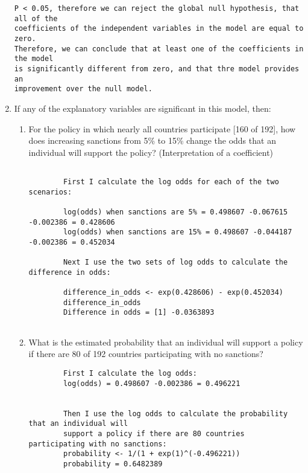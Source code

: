 \documentclass[12pt,letterpaper]{article}
\begin{document}
\begin{enumerate}
\begin{verbatim}
P < 0.05, therefore we can reject the global null hypothesis, that all of the
coefficients of the independent variables in the model are equal to zero.
Therefore, we can conclude that at least one of the coefficients in the model
is significantly different from zero, and that thre model provides an
improvement over the null model.

	\end{verbatim}
	
	\item
	If any of the explanatory variables are significant in this model, then:
	\begin{enumerate}
		\item
		For the policy in which nearly all countries participate [160 of 192], how does increasing sanctions from 5\% to 15\% change the odds that an individual will support the policy? (Interpretation of a coefficient)
		
	\begin{verbatim}	
		
		First I calculate the log odds for each of the two scenarios:
		
		log(odds) when sanctions are 5% = 0.498607 -0.067615 -0.002386 = 0.428606
		log(odds) when sanctions are 15% = 0.498607 -0.044187 -0.002386 = 0.452034
		
		Next I use the two sets of log odds to calculate the difference in odds:
		
		difference_in_odds <- exp(0.428606) - exp(0.452034)
		difference_in_odds
		Difference in odds = [1] -0.0363893
	
	\end{verbatim}		
		
		\item
		What is the estimated probability that an individual will support a policy if there are 80 of 192 countries participating with no sanctions? 
		
		\begin{verbatim}	
		First I calculate the log odds:	
		log(odds) = 0.498607 -0.002386 = 0.496221
		
		
		Then I use the log odds to calculate the probability that an individual will
		support a policy if there are 80 countries participating with no sanctions:
		probability <- 1/(1 + exp(1)^(-0.496221))
		probability = 0.6482389
		

\end{verbatim}
\end{enumerate}
\end{enumerate}
\end{document}
